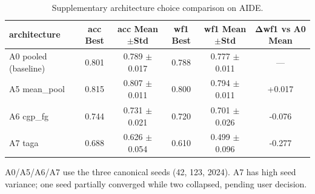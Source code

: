 \begin{table}[t]
\centering
\small
\begin{tabular}{lccccc}
\toprule
architecture & acc Best & acc Mean$\pm$Std & wf1 Best & wf1 Mean$\pm$Std & Δwf1 vs A0 Mean \\
\midrule
A0 pooled (baseline) & 0.801 & 0.789 $\pm$ 0.017 & 0.788 & 0.777 $\pm$ 0.011 & --- \\
A5 mean\_pool & 0.815 & 0.807 $\pm$ 0.011 & 0.800 & 0.794 $\pm$ 0.011 & +0.017 \\
A6 cgp\_fg & 0.744 & 0.731 $\pm$ 0.021 & 0.720 & 0.701 $\pm$ 0.026 & -0.076 \\
A7 taga & 0.688 & 0.626 $\pm$ 0.054 & 0.610 & 0.499 $\pm$ 0.096 & -0.277 \\
\bottomrule
\end{tabular}
\vspace{2pt}\footnotesize A0/A5/A6/A7 use the three canonical seeds (42, 123, 2024). A7 has high seed variance; one seed partially converged while two collapsed, pending user decision.
\caption{Supplementary architecture choice comparison on AIDE.}
\label{tab:supp_aide_architecture}
\end{table}

